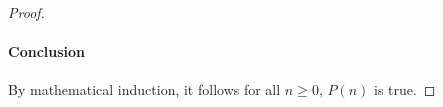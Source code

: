\documentclass{article}
\begin{document}
\begin{proof}
    \paragraph{Conclusion}%

      By mathematical induction, it follows for all $n \geq 0$, $P(n)$ is true.

  \end{proof}
\end{document}
